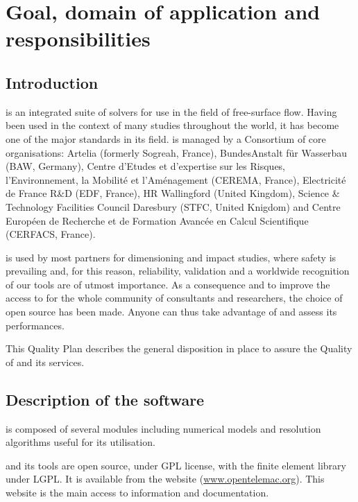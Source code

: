 \chapter{Goal, domain of application and responsibilities}

\section{Introduction}

\telemacsystem{} is an integrated suite of solvers for use in the field of
free-surface flow. Having been used in the context of many studies throughout
the world, it has become one of the major standards in its field.
\telemacsystem{} is managed by a Consortium of core organisations: Artelia
(formerly Sogreah, France), BundesAnstalt für Wasserbau (BAW, Germany), Centre
d’Etudes et d'expertise sur les Risques, l'Environnement, la Mobilité et
l'Aménagement (CEREMA, France), Electricité de France R\&D (EDF, France), HR
Wallingford (United Kingdom), Science \& Technology Facilities Council
Daresbury (STFC, United Knigdom) and Centre Européen de Recherche et de
Formation Avancée en Calcul Scientifique (CERFACS, France).

\telemacsystem{} is used by most partners for dimensioning and impact studies,
where safety is prevailing and, for this reason, reliability, validation and a
worldwide recognition of our tools are of utmost importance. As a consequence
and to improve the access to \telemacsystem{} for the whole community of
consultants and researchers, the choice of open source has been made. Anyone
can thus take advantage of \telemacsystem{} and assess its performances.

This Quality Plan describes the general disposition in place to assure the
Quality of \telemacsystem{} and its services.

\section{Description of the software}

\telemacsystem{} is composed of several modules including numerical models and
resolution algorithms useful for its utilisation.

\telemacsystem{} and its tools are open source, under GPL license, with the
\bief{} finite element library under LGPL\@. It is available from the
\telemacsystem{} website (\url{www.opentelemac.org}). This website is the main
access to \telemacsystem{} information and documentation.

